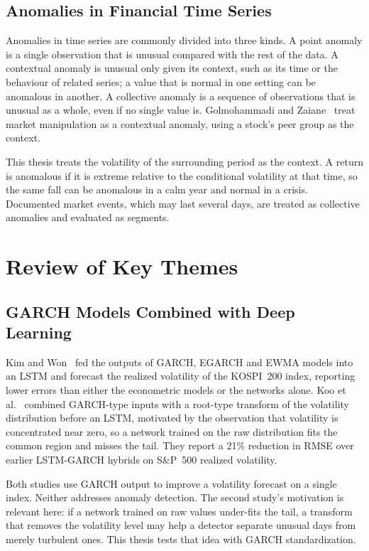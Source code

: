 \subsection{Anomalies in Financial Time Series}
Anomalies in time series are commonly divided into three kinds. A point anomaly is a
single observation that is unusual compared with the rest of the data. A contextual anomaly
is unusual only given its context, such as its time or the behaviour of related series; a
value that is normal in one setting can be anomalous in another. A collective anomaly is a
sequence of observations that is unusual as a whole, even if no single value is.
Golmohammadi and Zaiane~\cite{golmohammadi2015time} treat market manipulation as a
contextual anomaly, using a stock's peer group as the context.

This thesis treats the volatility of the surrounding period as the context. A return is
anomalous if it is extreme relative to the conditional volatility at that time, so the same
fall can be anomalous in a calm year and normal in a crisis. Documented market events,
which may last several days, are treated as collective anomalies and evaluated as segments.

\section{Review of Key Themes}\label{sec:lr-themes}

\subsection{GARCH Models Combined with Deep Learning}
Kim and Won~\cite{kim2018forecasting} fed the outputs of GARCH, EGARCH and EWMA models
into an LSTM and forecast the realized volatility of the KOSPI~200 index, reporting lower
errors than either the econometric models or the networks alone. Koo et
al.~\cite{koo2022hybrid} combined GARCH-type inputs with a root-type transform of the
volatility distribution before an LSTM, motivated by the observation that volatility is
concentrated near zero, so a network trained on the raw distribution fits the common
region and misses the tail. They report a 21\% reduction in RMSE over earlier LSTM-GARCH
hybrids on S\&P~500 realized volatility.

Both studies use GARCH output to improve a volatility forecast on a single index. Neither
addresses anomaly detection. The second study's motivation is relevant here: if a network
trained on raw values under-fits the tail, a transform that removes the volatility level
may help a detector separate unusual days from merely turbulent ones. This thesis tests
that idea with GARCH standardization.

